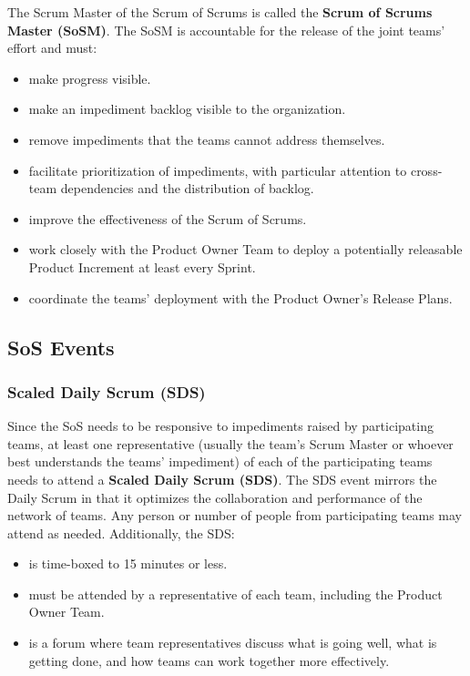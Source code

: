 \documentclass[12pt,a4paper,parskip=full]{scrartcl}
\begin{document}
The Scrum Master of the Scrum of Scrums is called the \textbf{Scrum of Scrums Master (SoSM)}. The SoSM is accountable for the release of the joint teams' effort and must:

\begin{itemize}
	\item make progress visible.
	\item make an impediment backlog visible to the organization.
	\item remove impediments that the teams cannot address themselves.
	\item facilitate prioritization of impediments, with particular attention to cross-team dependencies and the distribution of backlog.
	\item improve the effectiveness of the Scrum of Scrums.
	\item work closely with the Product Owner Team to deploy a potentially releasable Product Increment at least every Sprint.
	\item coordinate the teams' deployment with the Product Owner's Release Plans.
\end{itemize}

\subsection{SoS Events}

\subsubsection{Scaled Daily Scrum (SDS)}

Since the SoS needs to be responsive to impediments raised by participating teams, at least one representative (usually the team's Scrum Master or whoever best understands the teams' impediment) of each of the participating teams needs to attend a \textbf{Scaled Daily Scrum (SDS)}. The SDS event mirrors the Daily Scrum in that it optimizes the collaboration and performance of the network of teams. Any person or number of people from participating teams may attend as needed. Additionally, the SDS:

\begin{itemize}
	\item is time-boxed to 15 minutes or less.
	\item must be attended by a representative of each team, including the Product Owner Team.
	\item is a forum where team representatives discuss what is going well, what is getting done, and how teams can work together more effectively. 
\end{itemize}
	
\end{document}
